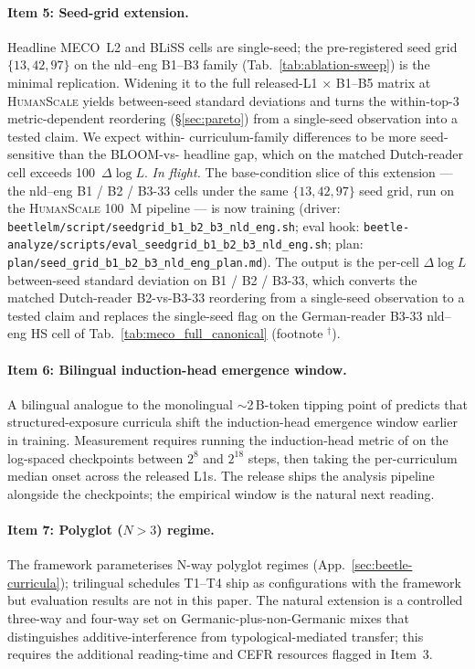 \paragraph{Item 5: Seed-grid extension.} Headline MECO~L2 and BLiSS cells are single-seed; the pre-registered seed grid $\{13, 42, 97\}$ on the nld--eng B1--B3 family (Tab.~\ref{tab:ablation-sweep}) is the minimal replication. Widening it to the full released-L1 $\times$ B1--B5 matrix at \textsc{HumanScale} yields between-seed standard deviations and turns the within-top-3 metric-dependent reordering (\S\ref{sec:pareto}) from a single-seed observation into a tested claim. We expect within-\beetle{} curriculum-family differences to be more seed-sensitive than the BLOOM-vs-\beetle{} headline gap, which on the matched Dutch-reader cell exceeds 100~$\Delta\log L$. \emph{In flight.} The base-condition slice of this extension --- the nld--eng B1 / B2 / B3-33 cells under the same $\{13, 42, 97\}$ seed grid, run on the \textsc{HumanScale} 100~M pipeline --- is now training (driver: \texttt{beetlelm/script/seedgrid\_b1\_b2\_b3\_nld\_eng.sh}; eval hook: \texttt{beetle-analyze/scripts/eval\_seedgrid\_b1\_b2\_b3\_nld\_eng.sh}; plan: \texttt{plan/seed\_grid\_b1\_b2\_b3\_nld\_eng\_plan.md}). The output is the per-cell $\Delta\log L$ between-seed standard deviation on B1 / B2 / B3-33, which converts the matched Dutch-reader B2-vs-B3-33 reordering from a single-seed observation to a tested claim and replaces the single-seed flag on the German-reader B3-33 nld--eng HS cell of Tab.~\ref{tab:meco_full_canonical} (footnote $^\dagger$).

\paragraph{Item 6: Bilingual induction-head emergence window.} A bilingual analogue to the monolingual $\sim$2\,B-token tipping point of \citet{aoyama-wilcox-2025-language} predicts that structured-exposure curricula shift the induction-head emergence window earlier in training. Measurement requires running the induction-head metric of \citet{aoyama2025predicting} on the log-spaced \beetle{} checkpoints between $2^{8}$ and $2^{18}$ steps, then taking the per-curriculum median onset across the released L1s. The release ships the analysis pipeline alongside the checkpoints; the empirical window is the natural next reading.

\paragraph{Item 7: Polyglot ($N{>}3$) regime.} The framework parameterises N-way polyglot regimes (App.~\ref{sec:beetle-curricula}); trilingual schedules T1--T4 ship as configurations with the framework but evaluation results are not in this paper. The natural extension is a controlled three-way and four-way set on Germanic-plus-non-Germanic mixes that distinguishes additive-interference from typological-mediated transfer; this requires the additional reading-time and CEFR resources flagged in Item~3.
